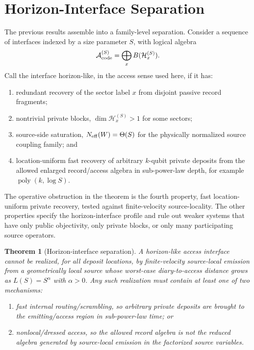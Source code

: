 \documentclass[11pt]{article}
\newtheorem{theorem}{Theorem}
\newcommand{\cH}{\mathcal H}
\newcommand{\cA}{\mathcal A}
\begin{document}
\section{Horizon-Interface Separation}

The previous results assemble into a family-level separation.  Consider
a sequence of interfaces indexed by a size parameter $S$, with logical
algebra
\begin{equation}
  \cA_{\rm code}^{(S)}
  =
  \bigoplus_x B(\cH_x^{(S)}).
\end{equation}
Call the interface horizon-like, in the access sense used here, if it
has:
\begin{enumerate}
  \item redundant recovery of the sector label $x$ from disjoint passive
  record fragments;
  \item nontrivial private blocks, $\dim\cH_x^{(S)}>1$ for some sectors;
  \item source-side saturation, $N_{\rm eff}(W)=\Theta(S)$ for the
  physically normalized source coupling family; and
  \item location-uniform fast recovery of arbitrary $k$-qubit private
  deposits from the allowed enlarged record/access algebra in
  sub-power-law depth, for example $\operatorname{poly}(k,\log S)$.
\end{enumerate}
The operative obstruction in the theorem is the fourth property, fast
location-uniform private recovery, tested against finite-velocity
source-locality.  The other properties specify the horizon-interface
profile and rule out weaker systems that have only public objectivity,
only private blocks, or only many participating source operators.

\begin{theorem}[Horizon-interface separation]
\label{thm:horizon-interface}
A horizon-like access interface cannot be realized, for all deposit
locations, by finite-velocity source-local emission from a geometrically
local source whose worst-case diary-to-access distance grows as
$L(S)=S^\alpha$ with $\alpha>0$.  Any such realization must contain at
least one of two mechanisms:
\begin{enumerate}
  \item fast internal routing/scrambling, so arbitrary private deposits
  are brought to the emitting/access region in sub-power-law time; or
  \item nonlocal/dressed access, so the allowed record algebra is not the
  reduced algebra generated by source-local emission in the factorized
  source variables.
\end{enumerate}
\end{theorem}
\end{document}
